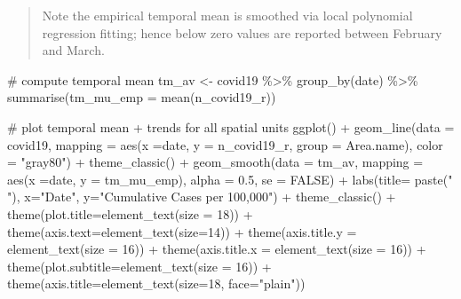 \documentclass[
  letterpaper,
  DIV=11,
  numbers=noendperiod,
  oneside]{scrreprt}
\newenvironment{Shaded}{\begin{snugshade}}{\end{snugshade}}
\newcommand{\AttributeTok}[1]{\textcolor[rgb]{0.40,0.45,0.13}{#1}}
\newcommand{\CommentTok}[1]{\textcolor[rgb]{0.37,0.37,0.37}{#1}}
\newcommand{\ConstantTok}[1]{\textcolor[rgb]{0.56,0.35,0.01}{#1}}
\newcommand{\DecValTok}[1]{\textcolor[rgb]{0.68,0.00,0.00}{#1}}
\newcommand{\FloatTok}[1]{\textcolor[rgb]{0.68,0.00,0.00}{#1}}
\newcommand{\FunctionTok}[1]{\textcolor[rgb]{0.28,0.35,0.67}{#1}}
\newcommand{\NormalTok}[1]{\textcolor[rgb]{0.00,0.23,0.31}{#1}}
\newcommand{\OtherTok}[1]{\textcolor[rgb]{0.00,0.23,0.31}{#1}}
\newcommand{\SpecialCharTok}[1]{\textcolor[rgb]{0.37,0.37,0.37}{#1}}
\newcommand{\StringTok}[1]{\textcolor[rgb]{0.13,0.47,0.30}{#1}}
\begin{document}
\begin{quote}
Note the empirical temporal mean is smoothed via local polynomial
regression fitting; hence below zero values are reported between
February and March.
\end{quote}

\begin{Shaded}
\begin{Highlighting}[]
\CommentTok{\# compute temporal mean}
\NormalTok{tm\_av }\OtherTok{\textless{}{-}}\NormalTok{ covid19 }\SpecialCharTok{\%\textgreater{}\%} \FunctionTok{group\_by}\NormalTok{(date) }\SpecialCharTok{\%\textgreater{}\%}
  \FunctionTok{summarise}\NormalTok{(}\AttributeTok{tm\_mu\_emp =} \FunctionTok{mean}\NormalTok{(n\_covid19\_r))}

\CommentTok{\# plot temporal mean + trends for all spatial units}
\FunctionTok{ggplot}\NormalTok{() }\SpecialCharTok{+}
  \FunctionTok{geom\_line}\NormalTok{(}\AttributeTok{data =}\NormalTok{ covid19, }\AttributeTok{mapping =} \FunctionTok{aes}\NormalTok{(}\AttributeTok{x =}\NormalTok{date, }\AttributeTok{y =}\NormalTok{ n\_covid19\_r,}
                          \AttributeTok{group =}\NormalTok{ Area.name), }\AttributeTok{color =} \StringTok{"gray80"}\NormalTok{) }\SpecialCharTok{+}
   \FunctionTok{theme\_classic}\NormalTok{() }\SpecialCharTok{+}
  \FunctionTok{geom\_smooth}\NormalTok{(}\AttributeTok{data =}\NormalTok{ tm\_av, }\AttributeTok{mapping =} \FunctionTok{aes}\NormalTok{(}\AttributeTok{x =}\NormalTok{date, }\AttributeTok{y =}\NormalTok{ tm\_mu\_emp), }
              \AttributeTok{alpha =} \FloatTok{0.5}\NormalTok{,}
              \AttributeTok{se =} \ConstantTok{FALSE}\NormalTok{) }\SpecialCharTok{+}
    \FunctionTok{labs}\NormalTok{(}\AttributeTok{title=} \FunctionTok{paste}\NormalTok{(}\StringTok{" "}\NormalTok{), }\AttributeTok{x=}\StringTok{"Date"}\NormalTok{, }\AttributeTok{y=}\StringTok{"Cumulative Cases per 100,000"}\NormalTok{) }\SpecialCharTok{+}
    \FunctionTok{theme\_classic}\NormalTok{() }\SpecialCharTok{+}
    \FunctionTok{theme}\NormalTok{(}\AttributeTok{plot.title=}\FunctionTok{element\_text}\NormalTok{(}\AttributeTok{size =} \DecValTok{18}\NormalTok{)) }\SpecialCharTok{+}
    \FunctionTok{theme}\NormalTok{(}\AttributeTok{axis.text=}\FunctionTok{element\_text}\NormalTok{(}\AttributeTok{size=}\DecValTok{14}\NormalTok{)) }\SpecialCharTok{+}
    \FunctionTok{theme}\NormalTok{(}\AttributeTok{axis.title.y =} \FunctionTok{element\_text}\NormalTok{(}\AttributeTok{size =} \DecValTok{16}\NormalTok{)) }\SpecialCharTok{+}
    \FunctionTok{theme}\NormalTok{(}\AttributeTok{axis.title.x =} \FunctionTok{element\_text}\NormalTok{(}\AttributeTok{size =} \DecValTok{16}\NormalTok{)) }\SpecialCharTok{+}
    \FunctionTok{theme}\NormalTok{(}\AttributeTok{plot.subtitle=}\FunctionTok{element\_text}\NormalTok{(}\AttributeTok{size =} \DecValTok{16}\NormalTok{)) }\SpecialCharTok{+}
    \FunctionTok{theme}\NormalTok{(}\AttributeTok{axis.title=}\FunctionTok{element\_text}\NormalTok{(}\AttributeTok{size=}\DecValTok{18}\NormalTok{, }\AttributeTok{face=}\StringTok{"plain"}\NormalTok{))}
\end{Highlighting}
\end{Shaded}
\end{document}

